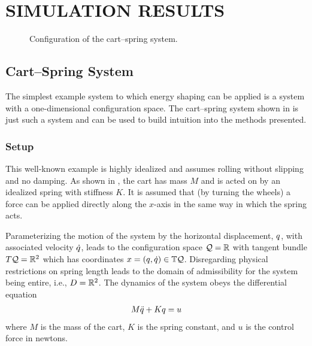 \chapter{\uppercase{Simulation Results}} \label{chap:simulations}



\begin{figure}[t!]
  \centering
  \def\svgwidth{0.7\columnwidth}
  
  \caption[Configuration of the cart--spring system.]{Configuration of the
    cart--spring system.}
  \label{fig:cart-spring-configuration}
\end{figure}

\section{Cart--Spring System}

The simplest example system to which energy shaping can be applied is a system
with a one-dimensional configuration space.
%
The cart--spring system shown in  is just
such a system and can be used to build intuition into the methods presented.

\subsection{Setup}

This well-known example is highly idealized and assumes rolling without slipping
and no damping.
%
As shown in , the cart has mass $M$ and is
acted on by an idealized spring with stiffness $K$.
%
It is assumed that (by turning the wheels) a force can be applied directly along
the $x$-axis in the same way in which the spring acts.

%
Parameterizing the motion of the system by the horizontal displacement, $q$, with
associated velocity $\dot{q}$, leads to the configuration space $\mathcal{Q} = \mathbb{R}$ with
tangent bundle $T\mathcal{Q} = \mathbb{R}^{2}$ which has coordinates $x = (q, \dot{q}) \in \mathbb{T}\mathcal{Q}$.
%
Disregarding physical restrictions on spring length leads to the domain of
admissibility for the system being entire, i.e., $D = \mathbb{R}^{2}$.
%
The dynamics of the system obeys the differential equation
\begin{align*}
  M \ddot{q} + K q = u
\end{align*}
where $M$ is the mass of the cart, $K$ is the spring constant, and $u$ is the
control force in newtons.

